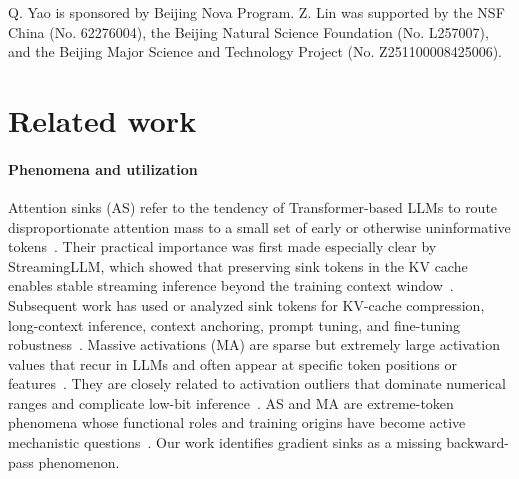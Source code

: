 \documentclass{article}
\theoremstyle{plain}
\theoremstyle{definition}
\theoremstyle{remark}
\begin{document}
Q. Yao is sponsored by Beijing Nova Program.
Z. Lin was supported by the NSF China (No. 62276004), the Beijing Natural Science Foundation (No. L257007), and the Beijing Major Science and Technology Project (No. Z251100008425006).




\clearpage
\appendix

\section{Related work}
\label{app:related_work}

\paragraph{Phenomena and utilization}
Attention sinks (AS) refer to the tendency of Transformer-based LLMs to route disproportionate attention mass to a small set of early or otherwise uninformative tokens~\cite{xiao2024streamingllm,gu2025when}. Their practical importance was first made especially clear by StreamingLLM, which showed that preserving sink tokens in the KV cache enables stable streaming inference beyond the training context window~\cite{xiao2024streamingllm}. Subsequent work has used or analyzed sink tokens for KV-cache compression, long-context inference, context anchoring, prompt tuning, and fine-tuning robustness~\cite{su2025kvsink,liu2026sinktrack,liu2025all,fu2026attention,liu2026surgery}. 
Massive activations (MA) are sparse but extremely large activation values that recur in LLMs and often appear at specific token positions or features~\cite{sun2024massive,an2025systematic}. They are closely related to activation outliers that dominate numerical ranges and complicate low-bit inference~\cite{dettmers2022gptint,bondarenko2023quantizable,xiao2023smoothquant}.
AS and MA are extreme-token phenomena whose functional roles and training origins have become active mechanistic questions~\cite{guo2025activedormant,qiu2026unified}. Our work identifies gradient sinks as a missing backward-pass phenomenon.
\end{document}
